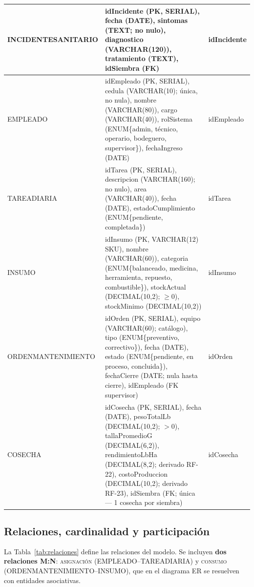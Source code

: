 \documentclass[11pt,a4paper]{article}
\renewcommand{\_}{\textunderscore\allowbreak}
\begin{document}
\begin{longtable}{|p{3.4cm}|p{8.9cm}|p{2.3cm}|}
INCIDENTE\_SANITARIO &
idIncidente (PK, SERIAL), fecha (DATE), sintomas (TEXT; no nulo), diagnostico (VARCHAR(120)), tratamiento (TEXT), idSiembra (FK)
& idIncidente \\
\hline

EMPLEADO &
idEmpleado (PK, SERIAL), cedula (VARCHAR(10); única, no nula), nombre (VARCHAR(80)), cargo (VARCHAR(40)), rolSistema (ENUM\{admin, técnico, operario, bodeguero, supervisor\}), fechaIngreso (DATE)
& idEmpleado \\
\hline

TAREA\_DIARIA &
idTarea (PK, SERIAL), descripcion (VARCHAR(160); no nulo), area (VARCHAR(40)), fecha (DATE), estadoCumplimiento (ENUM\{pendiente, completada\})
& idTarea \\
\hline

INSUMO &
idInsumo (PK, VARCHAR(12) SKU), nombre (VARCHAR(60)), categoria (ENUM\{balanceado, medicina, herramienta, repuesto, combustible\}), stockActual (DECIMAL(10,2); $\geq0$), stockMinimo (DECIMAL(10,2))
& idInsumo \\
\hline

ORDEN\_MANTENIMIENTO &
idOrden (PK, SERIAL), equipo (VARCHAR(60); catálogo), tipo (ENUM\{preventivo, correctivo\}), fecha (DATE), estado (ENUM\{pendiente, en proceso, concluida\}), fechaCierre (DATE; nula hasta cierre), idEmpleado (FK supervisor)
& idOrden \\
\hline

COSECHA &
idCosecha (PK, SERIAL), fecha (DATE), pesoTotalLb (DECIMAL(10,2); $>0$), tallaPromedioG (DECIMAL(6,2)), rendimientoLbHa (DECIMAL(8,2); derivado RF-22), costoProduccion (DECIMAL(10,2); derivado RF-23), idSiembra (FK; única --- 1 cosecha por siembra)
& idCosecha \\

\end{longtable}

\subsection{Relaciones, cardinalidad y participación}
La Tabla~\ref{tab:relaciones} define las relaciones del modelo. Se incluyen \textbf{dos relaciones M:N}: \textsc{asignación} (EMPLEADO--TAREA\_DIARIA) y \textsc{consumo} (ORDEN\_MANTENIMIENTO--INSUMO), que en el diagrama ER se resuelven con entidades asociativas.

\renewcommand{\arraystretch}{1.2}
\end{document}
